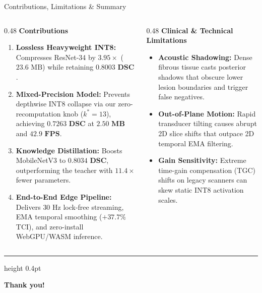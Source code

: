 \documentclass[aspectratio=169, 10pt]{beamer}
\begin{document}
\begin{frame}{Contributions, Limitations \& Summary}
\begin{columns}[T, onlytextwidth]
  \begin{column}{0.48\textwidth}
    \textbf{Contributions}
    \begin{enumerate}\setlength{\itemsep}{4pt}\footnotesize
      \item \textbf{Lossless Heavyweight INT8:} Compresses ResNet-34 by $3.95\times$ ($23.6\text{ MB}$) while retaining $\mathbf{0.8003\text{ DSC}}$.
      \item \textbf{Mixed-Precision Model:} Prevents depthwise INT8 collapse via our zero-recomputation knob ($k^*=13$), achieving $\mathbf{0.7263\text{ DSC}}$ at $\mathbf{2.50\text{ MB}}$ and $\mathbf{42.9\text{ FPS}}$.
      \item \textbf{Knowledge Distillation:} Boosts MobileNetV3 to $\mathbf{0.8034\text{ DSC}}$, outperforming the teacher with $11.4\times$ fewer parameters.
      \item \textbf{End-to-End Edge Pipeline:} Delivers $30\text{ Hz}$ lock-free streaming, EMA temporal smoothing ($+37.7\%$ TCI), and zero-install WebGPU/WASM inference.
    \end{enumerate}
  \end{column}

  \begin{column}{0.48\textwidth}
    \textbf{Clinical \& Technical Limitations}
    \begin{itemize}\setlength{\itemsep}{4pt}\footnotesize
      \item \textbf{Acoustic Shadowing:} Dense fibrous tissue casts posterior shadows that obscure lower lesion boundaries and trigger false negatives.
      \item \textbf{Out-of-Plane Motion:} Rapid transducer tilting causes abrupt 2D slice shifts that outpace 2D temporal EMA filtering.
      \item \textbf{Gain Sensitivity:} Extreme time-gain compensation (TGC) shifts on legacy scanners can skew static INT8 activation scales.
    \end{itemize}
  \end{column}
\end{columns}

\vspace{1.2em}
\hrule height 0.4pt
\vspace{0.8em}

\begin{center}
  \textbf{\textcolor{MedNavy}{\large Thank you! }}
\end{center}
\end{frame}
\end{document}
